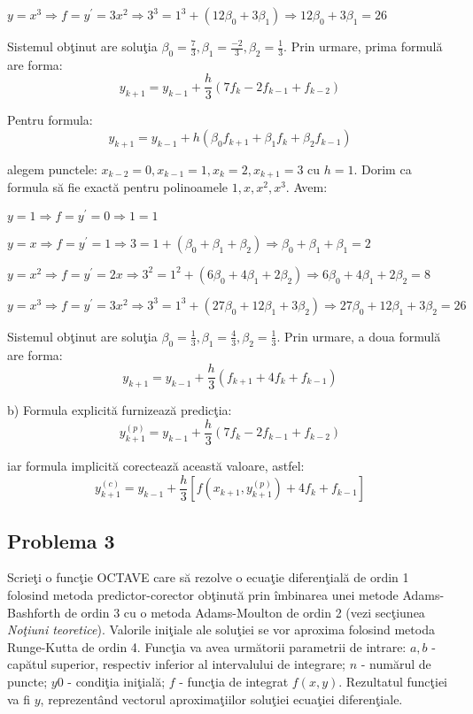 \documentclass{exam}
\begin{document}
$y=x^3 \Rightarrow f = y^{'} =3x^2 \Rightarrow 3^3 = 1^3 + (12\beta_{0}+3\beta_{1}) \Rightarrow 12\beta_{0}+3\beta_{1}= 26 $

Sistemul obţinut are soluţia $ \beta_{0} = \frac{7}{3}, \beta_{1} = \frac{-2}{3}, \beta_{2} = \frac{1}{3}$. Prin urmare, prima formulă are forma:
$$y_{k+1}=y_{k-1}+\frac{h}{3}(7f_{k}-2f_{k-1}+f_{k-2})$$

Pentru formula:
$$y_{k+1}=y_{k-1}+h(\beta_{0}f_{k+1}+\beta_{1}f_{k}+\beta_{2}f_{k-1})$$

\noindent alegem punctele: $x_{k-2}=0,x_{k-1}=1,x_{k}=2,x_{k+1}=3$ cu $h=1$. Dorim ca formula să fie exactă pentru polinoamele $1, x, x^2, x^3$. Avem:

$y=1 \Rightarrow f = y^{'} =0 \Rightarrow 1 = 1 $

$y=x \Rightarrow f = y^{'} =1 \Rightarrow 3 = 1 + (\beta_{0}+\beta_{1}+\beta_{2}) \Rightarrow \beta_{0} + \beta_{1} + \beta_{1}= 2 $

$y=x^2 \Rightarrow f = y^{'} =2x \Rightarrow 3^2 = 1^2 + (6\beta_{0}+4\beta_{1}+2\beta_{2}) \Rightarrow 6\beta_{0}+4\beta_{1}+2\beta_{2}= 8 $

$y=x^3 \Rightarrow f = y^{'} =3x^2 \Rightarrow 3^3 = 1^3 + (27\beta_{0}+12\beta_{1}+3\beta_{2}) \Rightarrow 27\beta_{0}+12\beta_{1}+3\beta_{2}= 26$

Sistemul obţinut are soluţia $ \beta_{0} = \frac{1}{3}, \beta_{1} = \frac{4}{3}, \beta_{2} = \frac{1}{3}$. Prin urmare, a doua formulă are forma:
$$y_{k+1}=y_{k-1}+\frac{h}{3}(f_{k+1}+4f_{k}+f_{k-1})$$

b) Formula explicită furnizează predicţia:
$$y_{k+1}^{(p)} = y_{k-1} + \frac{h}{3}(7 f_{k} - 2 f_{k-1} + f_{k-2} )$$

iar formula implicită corectează această valoare, astfel:
$$y_{k+1}^{(c)} = y_{k-1} + \frac{h}{3}[
		f(x_{k+1}, y_{k+1}^{(p)}) + 4f_{k} + f_{k-1}]$$


\subsection{Problema 3}

Scrieţi o funcţie OCTAVE care să rezolve o ecuaţie diferenţială de ordin 1 folosind metoda predictor-corector obţinută prin îmbinarea unei metode Adams-Bashforth de ordin 3 cu o metoda Adams-Moulton de ordin 2 (vezi secţiunea \textit{Noţiuni teoretice}). Valorile iniţiale ale soluţiei se vor aproxima folosind metoda Runge-Kutta de ordin 4. Funcţia va avea următorii parametrii de intrare: $a, b$ - capătul superior, respectiv inferior al intervalului de integrare; $n$ - numărul de puncte; $y0$ - condiţia iniţială; $f$ - funcţia de integrat $f(x,y)$. Rezultatul funcţiei va fi $y$, reprezentând vectorul aproximaţiilor soluţiei ecuaţiei diferenţiale.
\end{document}
